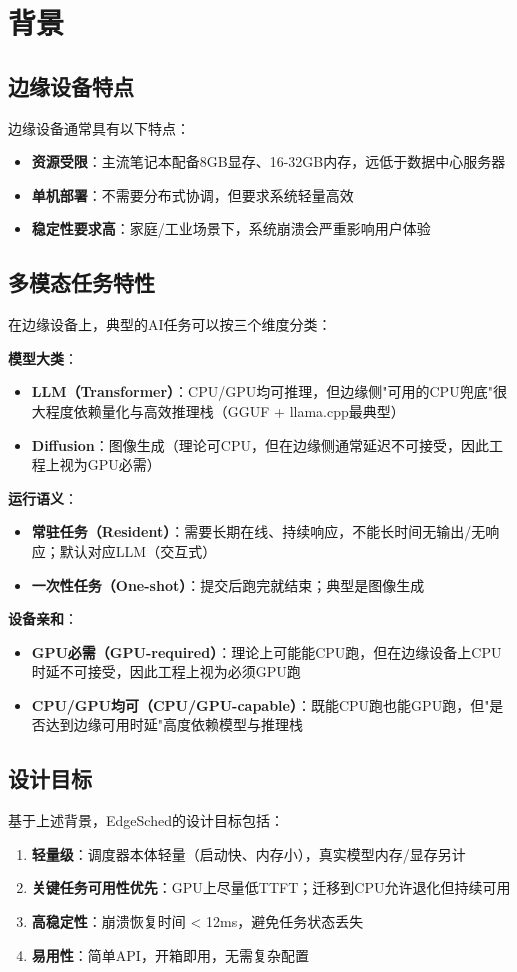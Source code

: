 \section{背景}

\subsection{边缘设备特点}

边缘设备通常具有以下特点：
\begin{itemize}
\item \textbf{资源受限}：主流笔记本配备8GB显存、16-32GB内存，远低于数据中心服务器
\item \textbf{单机部署}：不需要分布式协调，但要求系统轻量高效
\item \textbf{稳定性要求高}：家庭/工业场景下，系统崩溃会严重影响用户体验
\end{itemize}

\subsection{多模态任务特性}

在边缘设备上，典型的AI任务可以按三个维度分类：

\textbf{模型大类}：
\begin{itemize}
\item \textbf{LLM（Transformer）}：CPU/GPU均可推理，但边缘侧"可用的CPU兜底"很大程度依赖量化与高效推理栈（GGUF + llama.cpp最典型）
\item \textbf{Diffusion}：图像生成（理论可CPU，但在边缘侧通常延迟不可接受，因此工程上视为GPU必需）
\end{itemize}

\textbf{运行语义}：
\begin{itemize}
\item \textbf{常驻任务（Resident）}：需要长期在线、持续响应，不能长时间无输出/无响应；默认对应LLM（交互式）
\item \textbf{一次性任务（One-shot）}：提交后跑完就结束；典型是图像生成
\end{itemize}

\textbf{设备亲和}：
\begin{itemize}
\item \textbf{GPU必需（GPU-required）}：理论上可能能CPU跑，但在边缘设备上CPU时延不可接受，因此工程上视为必须GPU跑
\item \textbf{CPU/GPU均可（CPU/GPU-capable）}：既能CPU跑也能GPU跑，但"是否达到边缘可用时延"高度依赖模型与推理栈
\end{itemize}

\subsection{设计目标}

基于上述背景，EdgeSched的设计目标包括：

\begin{enumerate}
\item \textbf{轻量级}：调度器本体轻量（启动快、内存小），真实模型内存/显存另计
\item \textbf{关键任务可用性优先}：GPU上尽量低TTFT；迁移到CPU允许退化但持续可用
\item \textbf{高稳定性}：崩溃恢复时间 < 12ms，避免任务状态丢失
\item \textbf{易用性}：简单API，开箱即用，无需复杂配置
\end{enumerate}

